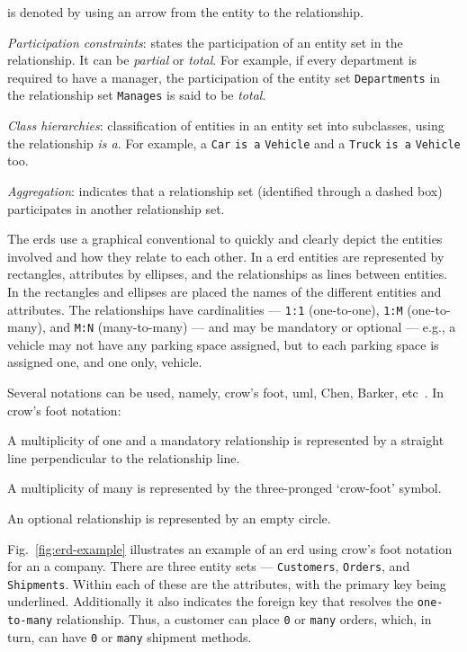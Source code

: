 \begin{item-c}
  is denoted by using an arrow from the entity to the relationship.
\item \emph{Participation constraints}: states the participation of an entity
  set in the relationship. It can be \emph{partial} or \emph{total}.
  For example, if every department is required to have a manager, the
  participation of the entity set \texttt{Departments} in the relationship set
  \texttt{Manages} is said to be \emph{total}.
\item \emph{Class hierarchies}: classification of entities in an entity set into
  subclasses, using the relationship \emph{is a}. For example, a \texttt{Car}
  \texttt{is a} \texttt{Vehicle} and a \texttt{Truck} \texttt{is a}
  \texttt{Vehicle} too. 
\item \emph{Aggregation}: indicates that a relationship set (identified through
  a dashed box) participates in another relationship set.
\end{item-c}

The \glspl{erd} use a graphical conventional to quickly and clearly depict the
entities involved and how they relate to each other. In a \gls{erd} entities are
represented by rectangles, attributes by ellipses, and the relationships as
lines between entities. In the rectangles and ellipses are placed the names of
the different entities and attributes. The relationships have cardinalities --- \texttt{1:1}
(one-to-one), \texttt{1:M} (one-to-many), and \texttt{M:N} (many-to-many) ---
and may be mandatory or optional --- e.g., a vehicle may not have any parking
space assigned, but to each parking space is assigned one, and one only,
vehicle.

Several notations can be used, namely, crow's foot, \gls{uml}, Chen, Barker,
etc~\cite{crowsfootNotation}.
In crow's foot notation:
\begin{item-c}
\item A multiplicity of one and a mandatory relationship is represented by a
  straight line perpendicular to the relationship line.
\item A multiplicity of many is represented by the three-pronged `crow-foot'
  symbol.
\item An optional relationship is represented by an empty circle.
\end{item-c}

Fig.~\ref{fig:erd-example} illustrates an example of an \acrfull{erd} using
crow's foot notation for an a company. There are three entity sets ---
\texttt{Customers}, \texttt{Orders}, and \texttt{Shipments}. Within each of
these are the attributes, with the primary key being underlined. Additionally it
also indicates the foreign key that resolves the \texttt{one-to-many}
relationship. Thus, a customer can place \texttt{0} or \texttt{many} orders, which, in
turn, can have \texttt{0} or \texttt{many} shipment methods.

